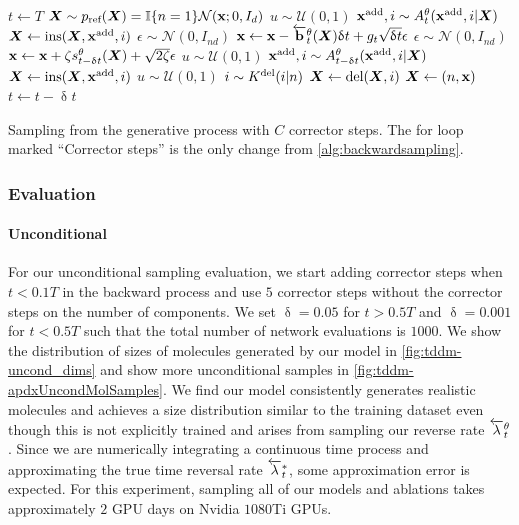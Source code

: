 \begin{algorithm}
\begin{algorithmic}[1]
    \State $t \leftarrow T$
    \State ${\bm{X}} \sim p_{\textup{ref}}({\bm{X}}) = \mathbb{I}\{ n=1\} \mathcal{N}({\mathbf{x}}; 0, I_{d})$
    \State $u \sim \mathcal{U}(0, 1)$
    \State ${\mathbf{x}}^{\textup{add}}, i \sim A_{t}^\theta({\mathbf{x}}^{\textup{add}}, i | {\bm{X}})$
    \State ${\bm{X}} \leftarrow \text{ins}({\bm{X}}, {\mathbf{x}}^{\textup{add}}, i)$
    \EndIf
    \State  $\epsilon \sim \mathcal{N}(0, I_{nd})$
    \State ${\mathbf{x}} \leftarrow {\mathbf{x}} - \overleftarrow{\mathbf{b}}_{t}^\theta({\bm{X}}) \updelta t + g_{t} \sqrt{\updelta t} \epsilon$
        \State $\epsilon \sim \mathcal{N}(0, I_{nd})$
        \State ${\mathbf{x}} \leftarrow {\mathbf{x}} + \zeta s_{t-\updelta t}^\theta({\bm{X}}) + \sqrt{2 \zeta} \epsilon$
        \State $u \sim \mathcal{U}(0, 1)$
        \State ${\mathbf{x}}^{\textup{add}}, i \sim A_{t-\updelta t}^\theta({\mathbf{x}}^{\textup{add}}, i | {\bm{X}})$
        \State ${\bm{X}} \leftarrow \text{ins}({\bm{X}}, {\mathbf{x}}^{\textup{add}}, i)$
        \EndIf
        \State $u \sim \mathcal{U}(0, 1)$
            \State $i \sim K^{\textup{del}}(i | n)$
            \State ${\bm{X}} \leftarrow \text{del}({\bm{X}}, i)$
        \EndIf
    \EndFor
    \State ${\bm{X}} \leftarrow (n, {\mathbf{x}})$
    \State $t \leftarrow t - \updelta t$
    \EndWhile
\end{algorithmic}
\caption{Sampling from the generative process with $C$ corrector steps. The for loop marked ``Corrector steps'' is the only change from \cref{alg:backwardsampling}.}
\label{alg:backwardsamplingWithCorrector}
\end{algorithm}

\subsubsection{Evaluation}
\paragraph{Unconditional}
For our unconditional sampling evaluation, we start adding corrector steps when $t<0.1T$ in the backward process and use $5$ corrector steps without the corrector steps on the number of components. We set $\updelta = 0.05$ for $ t > 0.5T$ and $\updelta = 0.001$ for $t<0.5T$ such that the total number of network evaluations is $1000$. We show the distribution of sizes of molecules generated by our model in \cref{fig:tddm-uncond_dims} and show more unconditional samples in \cref{fig:tddm-apdxUncondMolSamples}. We find our model consistently generates realistic molecules and achieves a size distribution similar to the training dataset even though this is not explicitly trained and arises from sampling our reverse rate $\overleftarrow{\lambda}_t^\theta$. Since we are numerically integrating a continuous time process and approximating the true time reversal rate $\overleftarrow{\lambda}_t^*$, some approximation error is expected. For this experiment, sampling all of our models and ablations takes approximately $2$ GPU days on Nvidia $1080$Ti GPUs.

